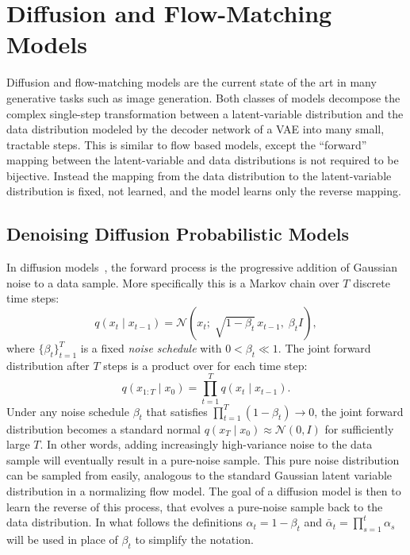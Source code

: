 
\section{Diffusion and Flow-Matching Models}
\label{sec:diffusion}

Diffusion and flow-matching models are the current state of the art in many generative tasks such as image generation.
Both classes of models decompose the complex single-step transformation between a latent-variable distribution and the data distribution modeled by the decoder network of a VAE into many small, tractable steps.
This is similar to flow based models, except the ``forward'' mapping between the latent-variable and data distributions is not required to be bijective.
Instead the mapping from the data distribution to the latent-variable distribution is fixed, not learned, and the model learns only the reverse mapping.

\subsection{Denoising Diffusion Probabilistic Models}
\label{sec:ddpm}

In diffusion models~\cite{sohl2015deep,Ho:2020ddpm}, the forward process is the progressive addition of Gaussian noise to a data sample.
More specifically this is a Markov chain over $T$ discrete time steps:
\begin{equation}
    q(x_t \mid x_{t-1}) = \mathcal{N}\!\left(x_t;\; \sqrt{1 - \beta_t}\, x_{t-1},\; \beta_t I\right),
    \label{eqn:forward_step}
\end{equation}
where $\{\beta_t\}_{t=1}^T$ is a fixed \textit{noise schedule} with $0 < \beta_t \ll 1$.
The joint forward distribution after $T$ steps is a product over  for each time step:
\begin{equation}
    q(x_{1:T} \mid x_0) = \prod_{t=1}^{T} q(x_t \mid x_{t-1}).
    \label{eqn:forward_joint}
\end{equation}
Under any noise schedule $\beta_t$ that satisfies $\prod_{t=1}^T (1 - \beta_t) \to 0$, the joint forward distribution becomes a standard normal $q(x_T \mid x_0) \approx \mathcal{N}(0, I)$ for sufficiently large $T$.
In other words, adding increasingly high-variance noise to the data sample will eventually result in a pure-noise sample.
This pure noise distribution can be sampled from easily, analogous to the standard Gaussian latent variable distribution in a normalizing flow model.
The goal of a diffusion model is then to learn the reverse of this process, that evolves a pure-noise sample back to the data distribution.
In what follows the definitions $\alpha_t = 1 - \beta_t$ and $\bar\alpha_t = \prod_{s=1}^t \alpha_s$ will be used in place of $\beta_t$ to simplify the notation.


